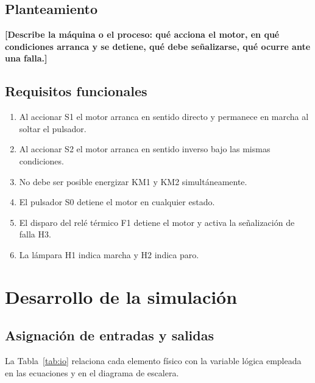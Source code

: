 \documentclass[conference,a4paper,10pt]{IEEEtran}
\begin{document}
\subsection{Planteamiento}
\textbf{[Describe la máquina o el proceso: qué acciona el motor, en qué
condiciones arranca y se detiene, qué debe señalizarse, qué ocurre ante una
falla.]}

\subsection{Requisitos funcionales}
\begin{enumerate}[label=\textbf{R\arabic*.},leftmargin=2.2em,itemsep=1pt,topsep=2pt]
  \item Al accionar S1 el motor arranca en sentido directo y permanece en
        marcha al soltar el pulsador.
  \item Al accionar S2 el motor arranca en sentido inverso bajo las mismas
        condiciones.
  \item No debe ser posible energizar KM1 y KM2 simultáneamente.
  \item El pulsador S0 detiene el motor en cualquier estado.
  \item El disparo del relé térmico F1 detiene el motor y activa la
        señalización de falla H3.
  \item La lámpara H1 indica marcha y H2 indica paro.
\end{enumerate}

\section{Desarrollo de la simulación}\label{sec:desarrollo}

\subsection{Asignación de entradas y salidas}
La Tabla~\ref{tab:io} relaciona cada elemento físico con la variable lógica
empleada en las ecuaciones y en el diagrama de escalera.
\end{document}
